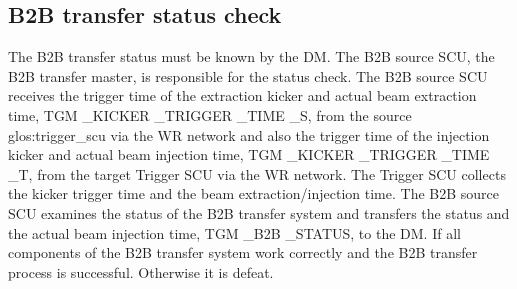 %
%
%
%

\subsection{B2B transfer status check}
The B2B transfer status must be known by the DM. The B2B source SCU, the B2B transfer master, is responsible for the status check. The B2B source SCU receives the trigger time of the extraction kicker and actual beam extraction time, TGM \_KICKER \_TRIGGER \_TIME \_S, from the source \gls{glos:trigger_scu} via the WR network and also the trigger time of the injection kicker and actual beam injection time, TGM \_KICKER \_TRIGGER \_TIME \_T, from the target Trigger SCU via the WR network. The Trigger SCU collects the kicker trigger time and the beam extraction/injection time. The B2B source SCU examines the status of the B2B transfer system and transfers the status and the actual beam injection time, TGM \_B2B \_STATUS, to the DM. If all components of the B2B transfer system work correctly and the B2B transfer process is successful. Otherwise it is defeat. 

